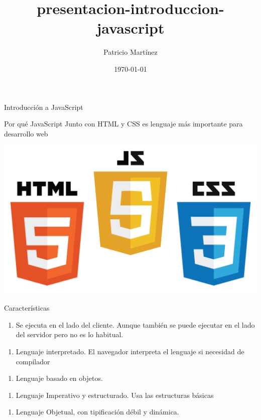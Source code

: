 \documentclass[presentation]{beamer}
\author{Patricio Martínez}
\date{\today}
\title{presentacion-introduccion-javascript}
\begin{document}
\maketitle


\begin{frame}[label={sec:org53a199b}]{Introducción a JavaScript}
\begin{block}{Por qué JavaScript}
Junto con HTML y CSS es lenguaje más importante para desarrollo web

\begin{center}
\includegraphics[width=.9\linewidth]{./img/html-css-js-logos.png}
\end{center}
\end{block}
\end{frame}
\begin{frame}[label={sec:orgca1aeac}]{Características}
\begin{enumerate}
\item Se ejecuta en el lado del cliente. Aunque también se puede ejecutar en el lado del servidor pero no es lo habitual.
\end{enumerate}
\pause
\begin{enumerate}
\item Lenguaje interpretado. El navegador interpreta el lenguaje si necesidad de compilador
\end{enumerate}
\pause
\begin{enumerate}
\item Lenguaje basado en objetos.
\end{enumerate}
\pause
\begin{enumerate}
\item Lenguaje Imperativo y estructurado. Usa las estructuras básicas
\end{enumerate}
\pause
\begin{enumerate}
\item Lenguaje Objetual, con tipificación débil y dinámica.
\end{enumerate}
\end{frame}
\end{document}
